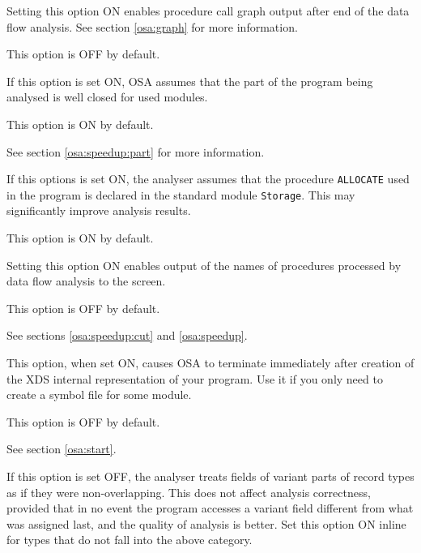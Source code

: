 \ifonline \else
\begin{description}
\fi
{}

        Setting this option ON enables procedure call graph output
        after end of the data flow analysis. See section \ref{osa:graph}
        for more information.

        This option is OFF by default.

 
        If this option is set ON, OSA assumes that the part of the 
        program being analysed is well closed for used \mt{} modules.

        This option is ON by default.

        See section \ref{osa:speedup:part} for more information.


        If this options is set ON, the analyser assumes that the
        procedure \verb'ALLOCATE' used in the program is declared in
        the standard module \verb'Storage'. This may significantly improve 
        analysis results.

        This option is ON by default.


        Setting this option ON enables output of the names of procedures
        processed by data flow analysis to the screen.

        This option is OFF by default.

        See sections \ref{osa:speedup:cut} and \ref{osa:speedup}.


        This option, when set ON, causes OSA to terminate immediately 
        after creation of the XDS internal representation of your program.
        Use it if you only need to create a symbol
        file for some module.

        This option is OFF by default.

        See section \ref{osa:start}. 

 \inline

        If this option is set OFF, the analyser treats fields of
        variant parts of \mt{} record types as if they were non-overlapping. 
        This does not affect analysis correctness, provided that in no event
        the program accesses a variant field different from what was assigned 
        last, and the quality of analysis is better.
        Set this option ON inline for types that do not fall into the above 
        category.


\end{description}
